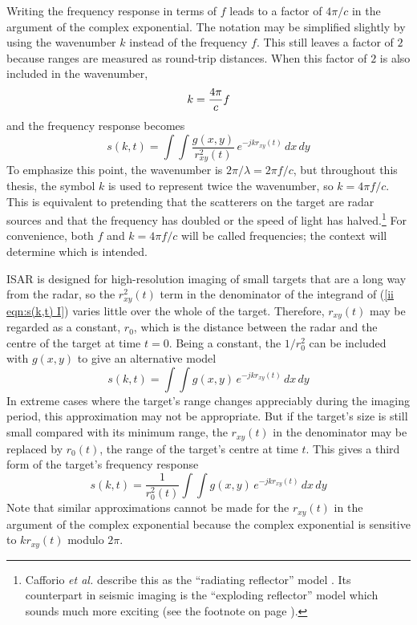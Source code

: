 Writing the frequency response in terms of $f$ leads to a factor of $4\pi/c$
in the argument of the complex exponential.  The notation may be simplified
slightly by using the wavenumber $k$ instead of the frequency $f$.  This
still leaves a factor of $2$ because ranges are measured as round-trip 
distances.  When this factor of $2$ is also included in the wavenumber,
\begin{equation}
k={\frac{4\pi}{c}} f
\end{equation}
and the frequency response becomes
\begin{equation}\label{ii eqn:s(k,t) I}
s(k,t)=\int\!\!\int\frac{g(x,y)}{r_{xy}^2(t)}\,e^{-jkr_{xy}(t)}\,dx\,dy
\end{equation}
To emphasize this point, the wavenumber is $2\pi/\lambda=2\pi f/c$, but
throughout this thesis, the symbol $k$ is used to represent twice the
wavenumber, so $k=4\pi f/c$.  This is equivalent to pretending that the
scatterers on the target are radar sources and that the frequency has 
doubled or the speed of light has halved.\footnote{\protect\label{ii ftn:rr}
Cafforio {\em et al.\/} describe this as the ``radiating reflector'' 
model \protect\cite{Caf91}.  Its counterpart in seismic imaging is the
``exploding reflector'' model which sounds much more exciting (see the
footnote on page \pageref{ii ftn:er}).}  For convenience, both $f$ and
$k=4\pi f/c$ will be called frequencies; the context will determine which is
intended.

ISAR is designed for high-resolution imaging of small targets that are a
long way from the radar, so the $r_{xy}^2(t)$ term in the denominator of the
integrand of (\ref{ii eqn:s(k,t) I}) varies little over the whole of the 
target.  Therefore, $r_{xy}(t)$ may be regarded as a constant, $r_0$, which
is the distance between the radar and the centre of the target at time
$t=0$. Being a constant, the $1/r_0^2$ can be included with $g(x,y)$ to give
an alternative model
\begin{equation}\label{ii eqn:s(k,t) II}
s(k,t)=\int\!\!\int g(x,y)\,e^{-jkr_{xy}(t)}\,dx\,dy
\end{equation}
In extreme cases where the target's range changes appreciably during the 
imaging period, this approximation may not be appropriate.  But if the 
target's size is still small compared with its minimum range, the $r_{xy}(t)$
in the denominator may be replaced by $r_0(t)$, the range of the target's
centre at time $t$.  This gives a third form of the target's frequency 
response 
\begin{equation}\label{ii eqn:s(k,t) III}
s(k,t)=\frac{1}{r_0^2(t)}\int\!\!\int g(x,y)\,e^{-jkr_{xy}(t)}\,dx\,dy
\end{equation}
Note that similar approximations cannot be made for the $r_{xy}(t)$ in the
argument of the complex exponential because the complex exponential is
sensitive to $kr_{xy}(t)$ modulo $2\pi$.

